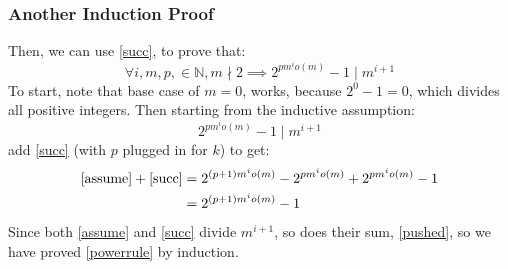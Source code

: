 \documentclass{article}
\begin{document}
  \subsubsection{Another Induction Proof}
  Then, we can use \eqref{succ}, to prove that:
  \begin{equation}\label{powerrule}
    \forall i, m ,p, \in \mathbb{N}, m \nmid 2 \implies 2^{pm^{i}o(m)} - 1 \mid m^{i+1}
  \end{equation}
  To start, note that base case of $m=0$, works, because $2^0 - 1 = 0$, which divides all positive integers. Then starting from the inductive assumption:
  \begin{equation}\label{assume}
    2^{pm^io(m)} - 1 \mid m^{i+1}
  \end{equation}
  add \eqref{succ} (with $p$ plugged in for $k$) to get:
  \begin{align}
    \eqref{assume} + \eqref{succ} &= 2^{(p+1)m^io(m)} - 2^{pm^io(m)} +2^{pm^io(m)} - 1\\
    &= 2^{(p+1)m^io(m)} - 1 \label{pushed}
  \end{align}
  Since both \eqref{assume} and \eqref{succ} divide $m^{i+1}$, so does their sum, \eqref{pushed}, so we have proved \eqref{powerrule} by induction.
\end{document}
